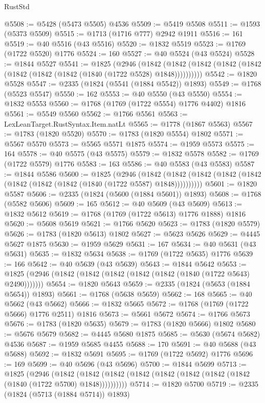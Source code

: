 \begin{lexlean}{RustStd}
\begin{coremodule}
@5508 := @5428 (@5473 @5505) @4536
@5509 := @5419 @5508
@5511 := @1593 (@5373 @5509)
@5515 := @1713 (@1716 @777) @2942 @1911
@5516 := 161
@5519 := @40 @5516 (@43 @5516)
@5520 := @1832 @5519
@5523 := @1769 (@1722 @5520) @1776
@5524 := 160
@5527 := @40 @5524 (@43 @5524)
@5528 := @1844 @5527
@5541 := @1825
    (@2946
      (@1842 (@1842 (@1842 (@1842 (@1842 (@1842 (@1842 (@1842 (@1840 (@1722 @5528) @1848))))))))))
@5542 := @1820 @5528
@5547 := @2335 (@1824 (@5541 (@1884 @5542)) @1893)
@5549 := @1768 (@5523 @5547)
@5550 := 162
@5553 := @40 @5550 (@43 @5550)
@5554 := @1832 @5553
@5560 := @1768 (@1769 (@1722 @5554) @1776 @4402) @1816
@5561 := @5549 @5560
@5562 := @1766 @5561
@5563 := LexLeanTarget.RustSyntax.Item.natLt
@5565 := @1778 (@1867 @5563)
@5567 := @1783 (@1820 @5520)
@5570 := @1783 (@1820 @5554) @1802
@5571 := @5567 @5570
@5573 := @5565 @5571 @1875
@5574 := @1959 @5573
@5575 := 164
@5578 := @40 @5575 (@43 @5575)
@5579 := @1832 @5578
@5582 := @1769 (@1722 @5579) @1776
@5583 := 163
@5586 := @40 @5583 (@43 @5583)
@5587 := @1844 @5586
@5600 := @1825
    (@2946
      (@1842 (@1842 (@1842 (@1842 (@1842 (@1842 (@1842 (@1842 (@1840 (@1722 @5587) @1848))))))))))
@5601 := @1820 @5587
@5606 := @2335 (@1824 (@5600 (@1884 @5601)) @1893)
@5608 := @1768 (@5582 @5606)
@5609 := 165
@5612 := @40 @5609 (@43 @5609)
@5613 := @1832 @5612
@5619 := @1768 (@1769 (@1722 @5613) @1776 @1888) @1816
@5620 := @5608 @5619
@5621 := @1766 @5620
@5623 := @1783 (@1820 @5579)
@5626 := @1783 (@1820 @5613) @1802
@5627 := @5623 @5626
@5629 := @4445 @5627 @1875
@5630 := @1959 @5629
@5631 := 167
@5634 := @40 @5631 (@43 @5631)
@5635 := @1832 @5634
@5638 := @1769 (@1722 @5635) @1776
@5639 := 166
@5642 := @40 @5639 (@43 @5639)
@5643 := @1844 @5642
@5653 := @1825 (@2946 (@1842 (@1842 (@1842 (@1842 (@1842 (@1840 (@1722 @5643) @2490)))))))
@5654 := @1820 @5643
@5659 := @2335 (@1824 (@5653 (@1884 @5654)) @1893)
@5661 := @1768 (@5638 @5659)
@5662 := 168
@5665 := @40 @5662 (@43 @5662)
@5666 := @1832 @5665
@5672 := @1768 (@1769 (@1722 @5666) @1776 @2511) @1816
@5673 := @5661 @5672
@5674 := @1766 @5673
@5676 := @1783 (@1820 @5635)
@5679 := @1783 (@1820 @5666) @1802
@5680 := @5676 @5679
@5682 := @4445 @5680 @1875
@5685 := @5630 (@5674 @5682) @4536
@5687 := @1959 @5685 @4455
@5688 := 170
@5691 := @40 @5688 (@43 @5688)
@5692 := @1832 @5691
@5695 := @1769 (@1722 @5692) @1776
@5696 := 169
@5699 := @40 @5696 (@43 @5696)
@5700 := @1844 @5699
@5713 := @1825
    (@2946
      (@1842 (@1842 (@1842 (@1842 (@1842 (@1842 (@1842 (@1842 (@1840 (@1722 @5700) @1848))))))))))
@5714 := @1820 @5700
@5719 := @2335 (@1824 (@5713 (@1884 @5714)) @1893)

\end{coremodule}
\end{lexlean}
